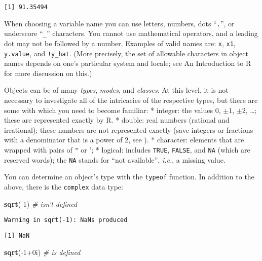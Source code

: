 \documentclass[]{book}
\newenvironment{Shaded}{\begin{snugshade}}{\end{snugshade}}
\newcommand{\KeywordTok}[1]{\textcolor[rgb]{0.13,0.29,0.53}{\textbf{{#1}}}}
\newcommand{\DecValTok}[1]{\textcolor[rgb]{0.00,0.00,0.81}{{#1}}}
\newcommand{\CommentTok}[1]{\textcolor[rgb]{0.56,0.35,0.01}{\textit{{#1}}}}
\newcommand{\NormalTok}[1]{{#1}}
\numberwithin{equation}{chapter}
\numberwithin{figure}{chapter}
\theoremstyle{plain}
\theoremstyle{definition}
\theoremstyle{remark}
\theoremstyle{definition}
\theoremstyle{definition}
\theoremstyle{remark}
\begin{document}
\begin{verbatim}
[1] 91.35494
\end{verbatim}

When choosing a variable name you can use letters, numbers, dots
``\texttt{.}'', or underscore ``\texttt{\_}'' characters. You cannot use
mathematical operators, and a leading dot may not be followed by a
number. Examples of valid names are: \texttt{x}, \texttt{x1},
\texttt{y.value}, and \texttt{!y\_hat}. (More precisely, the set of
allowable characters in object names depends on one's particular system
and locale; see An Introduction to R for more discussion on this.)

Objects can be of many \emph{types}, \emph{modes}, and \emph{classes}.
At this level, it is not necessary to investigate all of the intricacies
of the respective types, but there are some with which you need to
become familiar: * integer: the values \(0\), \(\pm1\), \(\pm2\),
\ldots{}; these are represented exactly by R. * double: real numbers
(rational and irrational); these numbers are not represented exactly
(save integers or fractions with a denominator that is a power of 2, see
\textcite{Venables2010} ). * character: elements that are wrapped with
pairs of \texttt{"} or '; * logical: includes \texttt{TRUE},
\texttt{FALSE}, and \texttt{NA} (which are reserved words); the
\texttt{NA}  stands for ``not available'',
\emph{i.e.}, a missing value.

You can determine an object's type with the \texttt{typeof}
 function. In addition to the above, there
is the \texttt{complex} 
 data type:

\begin{Shaded}
\begin{Highlighting}[]
\KeywordTok{sqrt}\NormalTok{(-}\DecValTok{1}\NormalTok{)              }\CommentTok{# isn't defined}
\end{Highlighting}
\end{Shaded}

\begin{verbatim}
Warning in sqrt(-1): NaNs produced
\end{verbatim}

\begin{verbatim}
[1] NaN
\end{verbatim}

\begin{Shaded}
\begin{Highlighting}[]
\KeywordTok{sqrt}\NormalTok{(-}\DecValTok{1}\NormalTok{+0i)           }\CommentTok{# is defined}
\end{Highlighting}
\end{Shaded}
\end{document}
